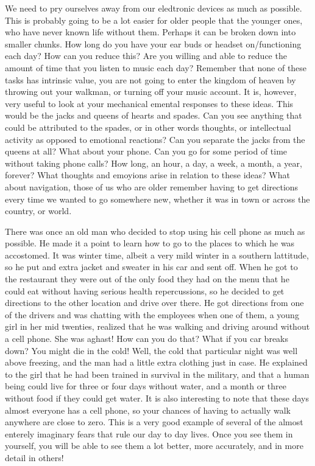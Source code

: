 \documentclass[12pt,letterpaper]{book}
\begin{document}
We need to pry ourselves away from our eledtronic devices as much as possible. This is probably going to be a lot easier for older people that the younger ones, who have never known life without them. Perhaps it can be broken down into smaller chunks. How long do you have your ear buds or headset on/functioning each day? How can you reduce this? Are you willing and able to reduce the amount of time that you listen to music each day? Remember that none of these tasks has intrinsic value, you are not going to enter the kingdom of heaven by throwing out your walkman, or turning off your music account. It is, however, very useful to look at your mechanical emental responses to these ideas. This would be the jacks and queens of hearts and spades. Can you see anything that could be attributed to the spades, or in other words thoughts, or intellectual activity as opposed to emotional reactions? Can you separate the jacks from the queens at all? What about your phone. Can you go for some period of time without taking phone calls? How long, an hour, a day, a week, a month, a year, forever? What thoughts and emoyions arise in relation to these ideas? What about navigation, those of us who are older remember having to get directions every time we wanted to go somewhere new, whether it was in town or across the country, or world.

There was once an old man who decided to stop using his cell phone as much as possible. He made it a point to learn how to go to the places to which he was accostomed. It was winter time, albeit a very mild winter in a southern lattitude, so he put and extra jacket and sweater in his car and sent off. When he got to the restaurant they were out of the only food they had on the menu that he could eat without having serious health repercussions, so he decided to get directions to the other location and drive over there. He got directions from one of the drivers and was chatting with the employees when one of them, a young girl in her mid twenties, realized that he was walking and driving around without a cell phone. She was aghast! How can you do that? What if you car breaks down? You might die in the cold! Well, the cold that particular night was well above freezing, and the man had a little extra clothing just in case. He explained to the girl that he had been trained in survival in the military, and that a human being could live for three or four days without water, and a month or three without food if they could get water. It is also interesting to note that these days almost everyone has a cell phone, so your chances of having to actually walk anywhere are close to zero. This is a very good example of several of the almost enterely imaginary fears that rule our day to day lives. Once you see them in  yourself, you will be able to see them a lot better, more accurately, and in more detail in others!
\end{document}
